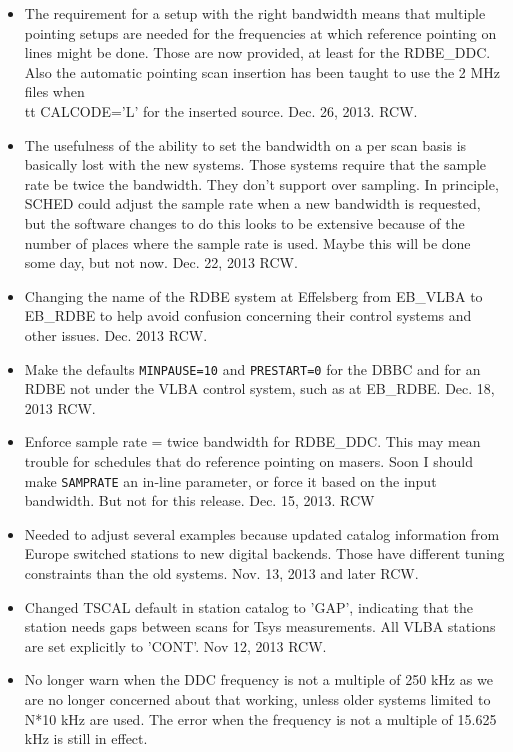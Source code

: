 \documentclass{report}
\begin{document}
\begin{itemize}
\item The requirement for a setup with the right bandwidth means that
multiple pointing setups are needed for the frequencies at which
reference pointing on lines might be done.  Those are now provided, at
least for the RDBE\_DDC.  Also the automatic pointing scan insertion
has been taught to use the 2 MHz files when {\\tt CALCODE='L'} for the
inserted source.  Dec. 26, 2013.  RCW.

\item The usefulness of the ability to set the bandwidth on a per
scan basis is basically lost with the new systems.  Those systems
require that the sample rate be twice the bandwidth.  They don't support
over sampling.  In principle, SCHED could adjust the sample rate when
a new bandwidth is requested, but the software changes to do this 
looks to be extensive because of the number of places where the sample
rate is used.  Maybe this will be done some day, but not now.  Dec. 22,
2013  RCW.

\item Changing the name of the RDBE system at Effelsberg from 
EB\_VLBA to EB\_RDBE to help avoid confusion concerning their
control systems and other issues.  Dec. 2013  RCW.

\item Make the defaults {\tt MINPAUSE=10} and {\tt PRESTART=0} 
for the DBBC and for an RDBE not under the VLBA control system,
such as at EB\_RDBE.  Dec. 18, 2013  RCW.

\item Enforce sample rate = twice bandwidth for RDBE\_DDC.  This
may mean trouble for schedules that do reference pointing on masers.
Soon I should make {\tt SAMPRATE} an in-line parameter, or force it
based on the input bandwidth.  But not for this release.
Dec. 15, 2013.  RCW

\item Needed to adjust several examples because updated catalog
information from Europe switched stations to new digital backends.
Those have different tuning constraints than the old systems.
Nov. 13, 2013 and later  RCW.

\item Changed TSCAL default in station catalog to 'GAP', indicating
that the station needs gaps between scans for Tsys measurements.
All VLBA stations are set explicitly to 'CONT'.  Nov 12, 2013  RCW.

\item No longer warn when the DDC frequency is not a multiple of
250 kHz as we are no longer concerned about that working, unless
older systems limited to N*10 kHz are used.  The error when the
frequency is not a multiple of 15.625 kHz is still in effect.


\end{itemize}
\end{document}
